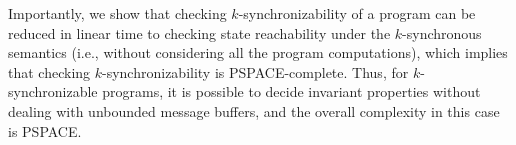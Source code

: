 Importantly, we show that checking $k$-synchronizability of a program can be reduced in linear time to checking state reachability under the $k$-synchronous semantics (i.e., without considering all the program computations), which implies that checking $k$-synchronizability is PSPACE-complete.
Thus, for $k$-synchronizable programs, it is possible to decide invariant properties without dealing with unbounded message buffers, and the overall complexity in this case is PSPACE. 

